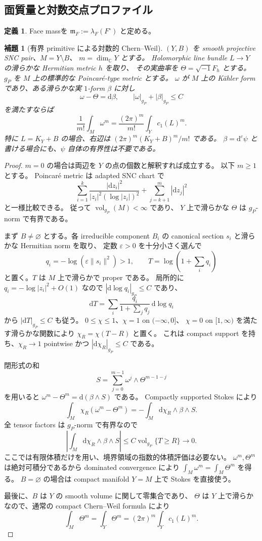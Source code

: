 \documentclass[11pt,a4paper]{ltjsarticle}
\newcommand{\CC}{\mathbb C}
\newcommand{\dd}{\mathrm d}
\theoremstyle{plain}
\newtheorem{lemma}[lemma]{補題}
\theoremstyle{definition}
\newtheorem{definition}[definition]{定義}
\theoremstyle{remark}
\begin{document}
\subsection{面質量と対数交点プロファイル}
\begin{definition}
Face massを $\mathfrak m_F:=\lambda_F(F^\circ)$ と定める。
\end{definition}

\begin{lemma}[有界 primitive による対数的 Chern--Weil]
\label{lem:CW}
$(Y,B)$ を smooth projective SNC pair、$M=Y\setminus B$、
$m=\dim_\CC Y$ とする。
Holomorphic line bundle $L\to Y$ の滑らかな Hermitian metric $h$ を取り、
その実曲率を $\Theta=\sqrt{-1}F_h$ とする。
$g_P$ を $M$ 上の標準的な Poincar\'e-type metric とする。
$\omega$ が $M$ 上の K\"ahler form であり、ある滑らかな実 $1$-form
$\beta$ に対し
\[
 \omega-\Theta=\dd\beta,
 \qquad
 |\omega|_{g_P}+|\beta|_{g_P}\le C
\]
を満たすならば
\[
 \frac1{m!}\int_M\omega^m
 =\frac{(2\pi)^m}{m!}\int_Yc_1(L)^m.
\]
特に $L=K_Y+B$ の場合、右辺は
$(2\pi)^m(K_Y+B)^m/m!$ である。
$\beta=\dd^c\psi$ と書ける場合にも、$\psi$ 自体の有界性は不要である。
\end{lemma}
\begin{proof}
$m=0$ の場合は両辺を $Y$ の点の個数と解釈すれば成立する。
以下 $m\ge1$ とする。
Poincar\'e metric は adapted SNC chart で
\[
 \sum_{i=1}^k
 \frac{|\dd z_i|^2}{|z_i|^2(\log|z_i|)^2}
 +\sum_{j=k+1}^m|\dd z_j|^2
\]
と一様比較できる。
従って $\operatorname{vol}_{g_P}(M)<\infty$ であり、
$Y$ 上で滑らかな $\Theta$ は $g_P$-norm で有界である。

まず $B\ne\varnothing$ とする。各 irreducible component $B_i$ の
canonical section $s_i$ と滑らかな Hermitian norm を取り、
定数 $\varepsilon>0$ を十分小さく選んで
\[
 q_i=-\log(\varepsilon\|s_i\|^2)>1,
 \qquad T=\log\left(1+\sum_iq_i\right)
\]
と置く。$T$ は $M$ 上で滑らかで proper である。
局所的に $q_i=-\log|z_i|^2+O(1)$ なので
$|\dd\log q_i|_{g_P}\le C$ であり、
\[
 \dd T=\sum_i\frac{q_i}{1+\sum_jq_j}\,\dd\log q_i
\]
から $|\dd T|_{g_P}\le C$ も従う。
$0\le\chi\le1$、$\chi=1$ on $(-\infty,0]$、
$\chi=0$ on $[1,\infty)$ を満たす滑らかな関数により
$\chi_R=\chi(T-R)$ と置く。
これは compact support を持ち、$\chi_R\to1$ pointwise かつ
$|\dd\chi_R|_{g_P}\le C$ である。

閉形式の和
\[
 S=\sum_{j=0}^{m-1}\omega^j\wedge\Theta^{m-1-j}
\]
を用いると $\omega^m-\Theta^m=\dd(\beta\wedge S)$ である。
Compactly supported Stokes により
\[
 \int_M\chi_R(\omega^m-\Theta^m)
 =-\int_M\dd\chi_R\wedge\beta\wedge S.
\]
全 tensor factors は $g_P$-norm で有界なので
\[
 \left|\int_M\dd\chi_R\wedge\beta\wedge S\right|
 \le C\operatorname{vol}_{g_P}\{T\ge R\}\longrightarrow0.
\]
ここでは有限体積だけを用い、境界領域の指数的体積評価は必要ない。
$\omega^m,\Theta^m$ は絶対可積分であるから dominated convergence により
$\int_M\omega^m=\int_M\Theta^m$ を得る。
$B=\varnothing$ の場合は compact manifold $Y=M$ 上で Stokes を直接使う。

最後に、$B$ は $Y$ の smooth volume に関して零集合であり、
$\Theta$ は $Y$ 上で滑らかなので、通常の compact Chern--Weil formula により
\[
 \int_M\Theta^m=\int_Y\Theta^m
 =(2\pi)^m\int_Yc_1(L)^m.
\]
\end{proof}
\end{document}
